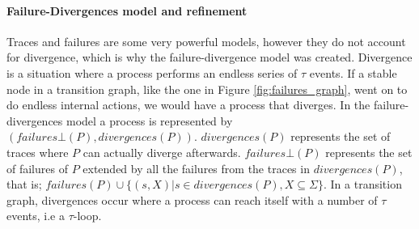 \paragraph{Failure-Divergences model and refinement}
Traces and failures are some very powerful models, however they do not account for divergence, which is why the failure-divergence model was created. Divergence is a situation where a process performs an endless series of $\tau$ events. If a stable node in a transition graph, like the one in Figure \ref{fig:failures_graph}, went on to do endless internal actions, we would have a process that diverges. In the failure-divergences model a process is represented by $(failures\bot(P), divergences(P))$. $divergences(P)$ represents the set of traces where $P$ can actually diverge afterwards. $failures\bot(P)$ represents the set of failures of $P$ extended by all the failures from the traces in $divergences(P)$, that is; $failures(P) \cup \{(s,X) | s \in divergences(P), X \subseteq \Sigma\}$.
In a transition graph, divergences occur where a process can reach itself with a number of $\tau$ events, i.e a $\tau$-loop.




